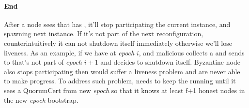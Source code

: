\paragraph{End}
After a node sees  that has , it'll stop participating the current \LBFT instance,
and spawning next \LBFT instance. If it's not part of the next reconfiguration, counterintuitively it can not shutdown itself
immediately otherwise we'll lose liveness. As an example, if we have  at \emph{epoch} $i$, and
malicious  collects a  and sends to  that's not part of \emph{epoch} $i+1$ and
 decides to shutdown itself. Byzantine node  also stops participating then  would suffer a liveness problem and are never
able to make progress. To address such problem,  needs to keep the  running until it sees a QuorumCert from new
\emph{epoch} so that it knows at least f+1 honest nodes in the new \emph{epoch} bootstrap.
